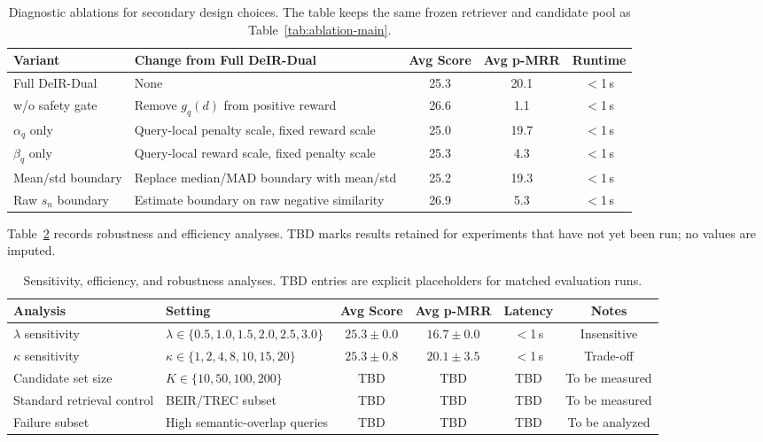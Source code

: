 \documentclass[letterpaper]{article}
\newcommand{\method}{DeIR-Dual}
\begin{document}
\begin{table}[!t]
\centering
\small
\begin{tabular}{llccc}
\toprule
\textbf{Variant} & \textbf{Change from Full \method{}} &
\textbf{Avg Score} & \textbf{Avg p-MRR} & \textbf{Runtime} \\
\midrule
Full \method{} & None & 25.3 & 20.1 & $<$1\,s \\
w/o safety gate & Remove $g_q(d)$ from positive reward & 26.6 & 1.1 & $<$1\,s \\
$\alpha_q$ only & Query-local penalty scale, fixed reward scale & 25.0 & 19.7 & $<$1\,s \\
$\beta_q$ only & Query-local reward scale, fixed penalty scale & 25.3 & 4.3 & $<$1\,s \\
Mean/std boundary & Replace median/MAD boundary with mean/std & 25.2 & 19.3 & $<$1\,s \\
Raw $s_n$ boundary & Estimate boundary on raw negative similarity & 26.9 & 5.3 & $<$1\,s \\
\bottomrule
\end{tabular}
\caption{Diagnostic ablations for secondary design choices.  The table
keeps the same frozen retriever and candidate pool as
Table~\ref{tab:ablation-main}.}
\label{tab:diagnostic-ablation}
\end{table}

Table~\ref{tab:sensitivity-efficiency} records robustness and efficiency
analyses.  \textnormal{TBD} marks results retained for experiments that
have not yet been run; no values are imputed.

\begin{table}[!t]
\centering
\small
\begin{tabular}{llcccc}
\toprule
\textbf{Analysis} & \textbf{Setting} & \textbf{Avg Score} &
\textbf{Avg p-MRR} & \textbf{Latency} & \textbf{Notes} \\
\midrule
$\lambda$ sensitivity & $\lambda \in \{0.5, 1.0, 1.5, 2.0, 2.5, 3.0\}$ & $25.3 \pm 0.0$ & $16.7 \pm 0.0$ & $<$1\,s & Insensitive \\
$\kappa$ sensitivity & $\kappa \in \{1, 2, 4, 8, 10, 15, 20\}$ & $25.3 \pm 0.8$ & $20.1 \pm 3.5$ & $<$1\,s & Trade-off \\
Candidate set size & $K \in \{10, 50, 100, 200\}$ & \textnormal{TBD} & \textnormal{TBD} & \textnormal{TBD} & To be measured \\
Standard retrieval control & BEIR/TREC subset & \textnormal{TBD} & \textnormal{TBD} & \textnormal{TBD} & To be measured \\
Failure subset & High semantic-overlap queries & \textnormal{TBD} & \textnormal{TBD} & \textnormal{TBD} & To be analyzed \\
\bottomrule
\end{tabular}
\caption{Sensitivity, efficiency, and robustness analyses.  \textnormal{TBD}
entries are explicit placeholders for matched evaluation runs.}
\label{tab:sensitivity-efficiency}
\end{table}
\end{document}
